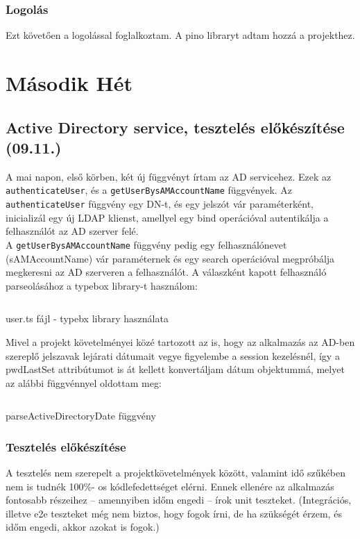 \documentclass[a4paper]{article}
\newcommand{\inlts}[1]{\texttt{#1}}
\begin{document}
\subsubsection*{Logolás}

Ezt követően a logolással foglalkoztam. A pino libraryt adtam hozzá a projekthez.

\section{Második Hét}

\subsection{Active Directory service, tesztelés előkészítése (09.11.)}

A mai napon, első körben, két új függvényt írtam az AD servicehez. Ezek az \inlts{authenticateUser}, és
a \inlts{getUserBysAMAccountName} függvények. Az \inlts{authenticateUser} függvény egy DN-t, és egy
jelszót vár paraméterként, inicializál egy új LDAP klienst, amellyel egy bind operációval autentikálja a
felhasználót az AD szerver felé. \\

A \inlts{getUserBysAMAccountName} függvény pedig egy felhasználónevet (sAMAccountName) vár
paraméternek és egy search operációval megpróbálja megkeresni az AD szerveren a felhasználót. A
válaszként kapott felhasználó parseolásához a typebox library-t használom:

\begin{listing}[!ht]
\inputminted[bgcolor=codebg, breaklines, breakanywhere, fontsize=\small]{typescript}{code/user.ts}
\caption{user.ts fájl - typebx library használata}
\label{listing:4}
\end{listing}

Mivel a projekt követelményei közé tartozott az is, hogy az alkalmazás az AD-ben szereplő jelszavak
lejárati dátumait vegye figyelembe a session kezelésnél, így a pwdLastSet attribútumot is át kellett
konvertáljam dátum objektummá, melyet az alábbi függvénnyel oldottam meg:

\begin{listing}[!ht]
\inputminted[bgcolor=codebg, breaklines, breakanywhere, fontsize=\small]{typescript}{code/activeDirectoryUtils.ts}
\caption{parseActiveDirectoryDate függvény}
\label{listing:5}
\end{listing}

\subsubsection*{Tesztelés előkészítése}
A tesztelés nem szerepelt a projektkövetelmények között, valamint idő szűkében nem is tudnék 100\%-
os kódlefedettséget elérni. Ennek ellenére az alkalmazás fontosabb részeihez – amennyiben időm
engedi – írok unit teszteket. (Integrációs, illetve e2e teszteket még nem biztos, hogy fogok írni, de ha
szükségét érzem, és időm engedi, akkor azokat is fogok.) \\
\end{document}
